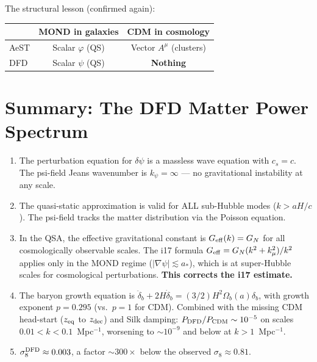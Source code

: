 \documentclass[aps,prd,twocolumn,nofootinbib]{revtex4-2}
\newcommand{\astar}{a_*}
\newcommand{\dpsi}{\delta\psi}
\newcommand{\Geff}{G_{\rm eff}}
\newcommand{\kmu}{k_\mu}
\newcommand{\kpsi}{k_\psi}
\begin{document}
The structural lesson (confirmed again):
\begin{center}
\begin{tabular}{lcc}
\toprule
& MOND in galaxies & CDM in cosmology \\
\midrule
AeST & Scalar $\varphi$ (QS) & Vector $A^\mu$ (clusters) \\
DFD & Scalar $\psi$ (QS) & \textbf{Nothing} \\
\bottomrule
\end{tabular}
\end{center}


\section{Summary: The DFD Matter Power Spectrum}
\label{sec:summary}

\begin{enumerate}
\item The perturbation equation for $\dpsi$ is a massless wave equation
  with $c_s = c$. The psi-field Jeans wavenumber is
  $\kpsi = \infty$ --- no gravitational instability at any scale.

\item The quasi-static approximation is valid for ALL sub-Hubble modes
  ($k > aH/c$). The psi-field tracks the matter distribution via the
  Poisson equation.

\item In the QSA, the effective gravitational constant is
  $\Geff(k) = G_N$ for all cosmologically observable scales. The i17
  formula $\Geff = G_N(k^2 + \kmu^2)/k^2$ applies only in the MOND
  regime ($|\nabla\psi| \lesssim \astar$), which is at super-Hubble
  scales for cosmological perturbations. \textbf{This corrects the i17
  estimate.}

\item The baryon growth equation is $\ddot\delta_b + 2H\dot\delta_b
  = (3/2)H^2\Omega_b(a)\delta_b$, with growth exponent $p = 0.295$
  (vs.\ $p = 1$ for CDM). Combined with the missing CDM head-start
  ($z_{\rm eq}$ to $z_{\rm dec}$) and Silk damping:
  $P_{\rm DFD}/P_{\rm CDM} \sim 10^{-5}$ on scales
  $0.01 < k < 0.1$~Mpc$^{-1}$, worsening to $\sim 10^{-9}$ and below
  at $k > 1$~Mpc$^{-1}$.

\item $\sigma_8^{\rm DFD} \approx 0.003$, a factor $\sim 300\times$
  below the observed $\sigma_8 \approx 0.81$.
\end{enumerate}
\end{document}
